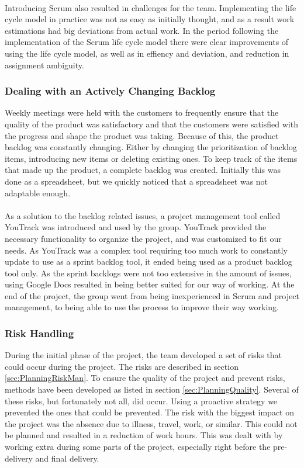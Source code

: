\paragraph{} Introducing Scrum also resulted in challenges for the team. Implementing the life cycle model in practice was not as easy as initially thought, and as a result work estimations had big deviations from actual work. In the period following the implementation of the Scrum life cycle model there were clear improvements of using the life cycle model, as well as in effiency and deviation, and reduction in assignment ambiguity. 
\subsubsection{Dealing with an Actively Changing Backlog} Weekly meetings were held with the customers to frequently ensure that the quality of the product was satisfactory and that the customers were satisfied with the progress and shape the product was taking. Because of this, the product backlog was constantly changing. Either by changing the prioritization of backlog items, introducing new items or deleting existing ones. To keep track of the items that made up the product, a complete backlog was created. Initially this was done as a spreadsheet, but we quickly noticed that a spreadsheet was not adaptable enough. 
\paragraph{} As a solution to the backlog related issues, a project management tool called YouTrack was introduced and used by the group. YouTrack provided the necessary functionality to organize the project, and was customized to fit our needs. As YouTrack was a complex tool requiring too much work to constantly update to use as a sprint backlog tool, it ended being used as a product backlog tool only. As the sprint backlogs were not too extensive in the amount of issues, using Google Docs resulted in being better suited for our way of working. At the end of the project, the group went from being inexperienced in Scrum and project management, to being able to use the process to improve their way working.
\subsubsection{Risk Handling} During the initial phase of the project, the team developed a set of risks that could occur during the project. The risks are described in section \ref{sec:PlanningRiskMan}. To ensure the quality of the project and prevent risks, methods have been developed as listed in section \ref{sec:PlanningQuality}. Several of these risks, but fortunately not all, did occur. Using a proactive strategy we prevented the ones that could be prevented. The risk with the biggest impact on the project was the absence due to illness, travel, work, or similar. This could not be planned and resulted in a reduction of work hours. This was dealt with by working extra during some parts of the project, especially right before the pre-delivery and final delivery. 
